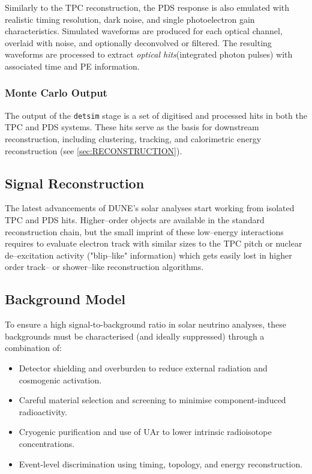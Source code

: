 Similarly to the \ac{TPC} reconstruction, the \ac{PDS} response is also emulated with realistic timing resolution, dark noise, and single photoelectron gain characteristics. Simulated waveforms are produced for each optical channel, overlaid with noise, and optionally deconvolved or filtered. The resulting waveforms are processed to extract \emph{optical hits}(integrated photon pulses) with associated time and PE information.

\iffalse
    \subsubsection{Monte Carlo Output}

    The output of the \texttt{detsim} stage is a set of digitised and processed hits in both the TPC and PDS systems. These hits serve as the basis for downstream reconstruction, including clustering, tracking, and calorimetric energy reconstruction (see \cref{sec:RECONSTRUCTION}).

    \subsection{Signal Reconstruction}\label{sec:NEUTRINO_SIMULATION}
    The latest advancements of DUNE's solar analyses start working from isolated TPC and PDS hits. Higher--order objects are available in the standard reconstruction chain, but the small imprint of these low--energy interactions requires to evaluate electron track with similar sizes to the TPC pitch or nuclear de--excitation activity ("blip--like" information) which gets easily lost in higher order track-- or shower--like reconstruction algorithms.

    \subsection{Background Model}\label{sec:BACKGROUND_MODEL}
    To ensure a high signal-to-background ratio in solar neutrino analyses, these backgrounds must be characterised (and ideally suppressed) through a combination of:

    \begin{itemize}
        \item Detector shielding and overburden to reduce external radiation and cosmogenic activation.
        \item Careful material selection and screening to minimise component-induced radioactivity.
        \item Cryogenic purification and use of UAr to lower intrinsic radioisotope concentrations.
        \item Event-level discrimination using timing, topology, and energy reconstruction.
    \end{itemize}

